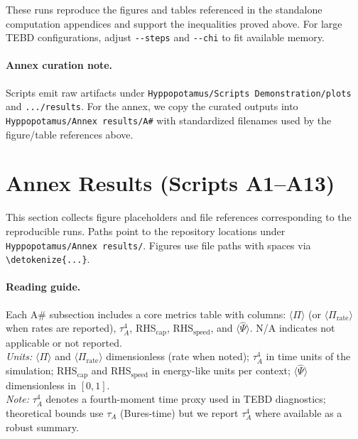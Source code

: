 \documentclass[10pt]{article}
\begin{document}
These runs reproduce the figures and tables referenced in the standalone computation appendices and support the inequalities proved above. For large TEBD configurations, adjust \verb|--steps| and \verb|--chi| to fit available memory.

\paragraph{Annex curation note.}
Scripts emit raw artifacts under \texttt{Hyppopotamus/Scripts Demonstration/plots} and \texttt{.../results}. For the annex, we copy the curated outputs into \texttt{Hyppopotamus/Annex results/A\#} with standardized filenames used by the figure/table references above.

\section{Annex Results (Scripts A1--A13)}\label{app:annex}

This section collects figure placeholders and file references corresponding to the reproducible runs. Paths point to the repository locations under \texttt{Hyppopotamus/Annex results/}. Figures use file paths with spaces via \verb|\detokenize{...}|.

\paragraph{Reading guide.}
Each A\# subsection includes a core metrics table with columns: $\langle\Pi\rangle$ (or $\langle\Pi_{\mathrm{rate}}\rangle$ when rates are reported), $\tau_A^4$, RHS$_{\mathrm{cap}}$, RHS$_{\mathrm{speed}}$, and $\langle\widehat{\Psi}\rangle$. N/A indicates not applicable or not reported.
\\[2pt]\textit{Units:} $\langle\Pi\rangle$ and $\langle\Pi_{\mathrm{rate}}\rangle$ dimensionless (rate when noted); $\tau_A^4$ in time units of the simulation; RHS$_{\mathrm{cap}}$ and RHS$_{\mathrm{speed}}$ in energy-like units per context; $\langle\widehat{\Psi}\rangle$ dimensionless in $[0,1]$.
\\[2pt]\textit{Note:} $\tau_A^4$ denotes a fourth-moment time proxy used in TEBD diagnostics; theoretical bounds use $\tau_A$ (Bures-time) but we report $\tau_A^4$ where available as a robust summary.
\end{document}
